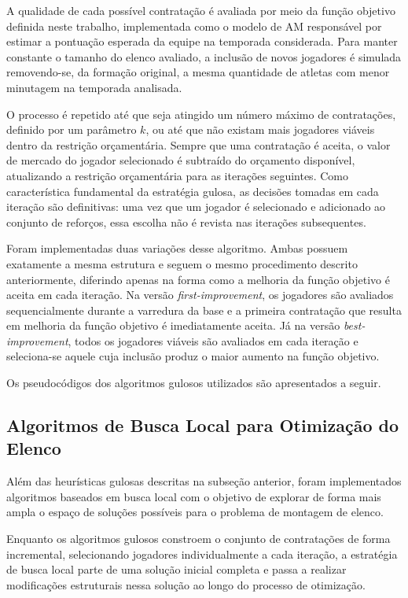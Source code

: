 A qualidade de cada possível contratação é avaliada por meio da função objetivo definida neste trabalho, implementada como o modelo de AM responsável 
por estimar a pontuação esperada da equipe na temporada considerada. Para manter constante o tamanho do elenco avaliado, a inclusão de novos jogadores 
é simulada removendo-se, da formação original, a mesma quantidade de atletas com menor minutagem na temporada analisada.

O processo é repetido até que seja atingido um número máximo de contratações, definido por um parâmetro \(k\), ou até que não existam mais jogadores 
viáveis dentro da restrição orçamentária. Sempre que uma contratação é aceita, o valor de mercado do jogador selecionado é subtraído do orçamento disponível, 
atualizando a restrição orçamentária para as iterações seguintes. Como característica fundamental da estratégia gulosa, as decisões tomadas em cada 
iteração são definitivas: uma vez que um jogador é selecionado e adicionado ao conjunto de reforços, essa escolha não é revista nas iterações subsequentes.

Foram implementadas duas variações desse algoritmo. Ambas possuem exatamente a mesma estrutura e seguem o mesmo procedimento descrito anteriormente, 
diferindo apenas na forma como a melhoria da função objetivo é aceita em cada iteração. Na versão \textit{first-improvement}, os jogadores são avaliados 
sequencialmente durante a varredura da base e a primeira contratação que resulta em melhoria da função objetivo é imediatamente aceita. 
Já na versão \textit{best-improvement}, todos os jogadores viáveis são avaliados em cada iteração e seleciona-se aquele cuja inclusão 
produz o maior aumento na função objetivo.

Os pseudocódigos dos algoritmos gulosos utilizados são apresentados a seguir.





\subsection{Algoritmos de Busca Local para Otimização do Elenco}

Além das heurísticas gulosas descritas na subseção anterior, foram implementados algoritmos baseados em busca local com o objetivo de explorar de 
forma mais ampla o espaço de soluções possíveis para o problema de montagem de elenco.

Enquanto os algoritmos gulosos constroem o conjunto de contratações de forma incremental, selecionando jogadores individualmente a cada iteração, 
a estratégia de busca local parte de uma solução inicial completa e passa a realizar modificações estruturais nessa solução ao longo do processo de otimização.

